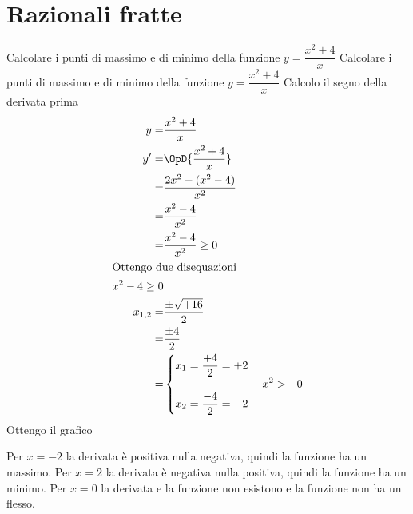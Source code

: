 \section{Razionali fratte}
\tcbstartrecording
\begin{exercise}
Calcolare i punti di massimo e di minimo della funzione $y=\dfrac{x^2+4}{x}$
	\tcblower
Calcolare i punti di massimo e di minimo della funzione $y=\dfrac{x^2+4}{x}$
Calcolo il segno della derivata prima
\begin{align*}
y=&\dfrac{x^2+4}{x}\\
y'=&\OpD{\dfrac{x^2+4}{x}}\\
=&\frac{2x^2-(x^2-4)}{x^{2}}\\
=&\frac{x^{2} - 4}{x^{2}}\\
=&\frac{x^{2} - 4}{x^{2}}\geq 0\\
\intertext{Ottengo due disequazioni}
x^2-4\geq 0\\
x_{1,2}=&\dfrac{\pm\sqrt{+16}}{2}\\
=&\dfrac{\pm 4}{2}\\
=&\begin{cases}
x_1=\dfrac{+4}{2}=+2\\
\\
x_2=\dfrac{-4}{2}=-2\\
\end{cases}
x^2>&0
\end{align*}
Ottengo il grafico
\begin{center}
	
\end{center}
Per $x=-2$ la derivata è positiva nulla negativa, quindi la funzione ha un massimo. Per $x=2$ la derivata è negativa nulla positiva, quindi la funzione ha un minimo. Per $x=0$ la  derivata e la funzione non esistono e la funzione non ha un flesso.
\end{exercise}
